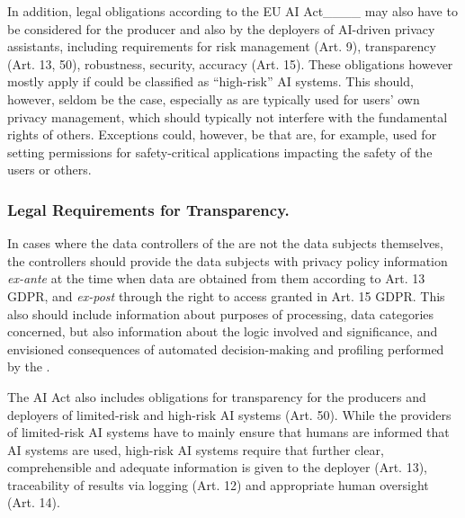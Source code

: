 In addition, legal obligations according to the EU AI Act____ may also have to be considered for the producer and also by the deployers of AI-driven privacy assistants, including requirements for risk management (Art. 9), transparency (Art. 13, 50), robustness, security, accuracy (Art. 15). These obligations however mostly apply if \PPAs could be classified as ``high-risk'' AI systems. This should, however, seldom be the case, especially as \PPAs are typically used for users' own privacy management, which should typically not interfere with the fundamental rights of others.
Exceptions could, however, be \PPAs that are, for example, used for setting permissions for safety-critical applications impacting the safety of the users or others.



\subsubsection{Legal Requirements for Transparency.}
In cases where the data controllers of the \PPAs are not the data subjects themselves, the controllers should provide the data subjects with privacy policy information \textit{ex-ante} at the time when data are obtained from them according to Art. 13 GDPR, and \textit{ex-post} through the right to access granted in Art. 15 GDPR.
This also should include information about purposes of processing, data categories concerned, but also information about the logic involved and significance, and envisioned consequences of automated decision-making and profiling performed by the \PPAs.

The AI Act also includes obligations for transparency for the producers and deployers of limited-risk and high-risk AI systems (Art. 50). While the providers of limited-risk AI systems have to mainly ensure that humans are informed that AI systems are used, high-risk AI systems require that further clear, comprehensible and adequate information is given to the deployer (Art. 13), traceability of results via logging (Art. 12) and appropriate human oversight (Art. 14).

